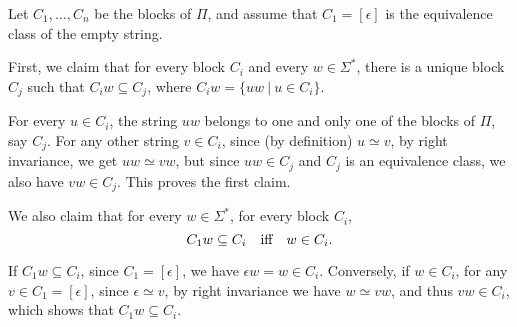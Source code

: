 \proof
Let $C_1, \ldots, C_n$ be the blocks of $\Pi$,
and assume that $C_1 = [\epsilon]$ is the equivalence class
of the empty string.

\medskip
First, we claim that for every  block
$C_i$ and every $w\in \Sigma^*$, there is a unique block $C_j$
such that $C_i w \subseteq C_j$,
where $C_i w = \{uw\ |\ u\in C_i\}$.

\medskip
For every $u\in C_i$, the string $uw$ belongs to one 
and only one of the
blocks of $\Pi$, say $C_j$.
For any other string $v\in C_i$, since (by definition) $u\simeq v$,
by right invariance, we get $uw\simeq vw$,
but since $uw\in C_j$ and $C_j$
is an equivalence class,  we also have $vw\in C_j$.
This proves the first claim.

\medskip
We also claim that for every $w\in\Sigma^*$, for every block $C_i$,
$$C_1 w\subseteq C_i\quad\hbox{iff}\quad w\in C_i.$$

\medskip
If $C_1 w\subseteq C_i$, since $C_1 = [\epsilon]$, we have
$\epsilon w = w\in C_i$. Conversely, if $w\in C_i$,
for any $v\in C_1 = [\epsilon]$, since $\epsilon \simeq v$,
by right invariance we have $w \simeq vw$,
and thus $vw \in C_i$, which shows that $C_1 w\subseteq C_i$.


